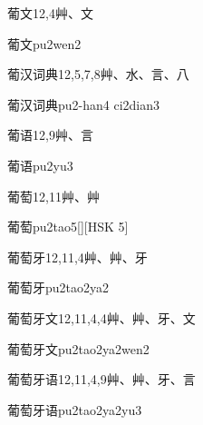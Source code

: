 \begin{Entry}{葡文}{12,4}{⾋、⽂}
  \begin{Phonetics}{葡文}{pu2wen2}
  \end{Phonetics}
\end{Entry}

\begin{Entry}{葡汉词典}{12,5,7,8}{⾋、⽔、⾔、⼋}
  \begin{Phonetics}{葡汉词典}{pu2-han4 ci2dian3}
  \end{Phonetics}
\end{Entry}

\begin{Entry}{葡语}{12,9}{⾋、⾔}
  \begin{Phonetics}{葡语}{pu2yu3}
  \end{Phonetics}
\end{Entry}

\begin{Entry}{葡萄}{12,11}{⾋、⾋}
  \begin{Phonetics}{葡萄}{pu2tao5}[][HSK 5]
  \end{Phonetics}
\end{Entry}

\begin{Entry}{葡萄牙}{12,11,4}{⾋、⾋、⽛}
  \begin{Phonetics}{葡萄牙}{pu2tao2ya2}
  \end{Phonetics}
\end{Entry}

\begin{Entry}{葡萄牙文}{12,11,4,4}{⾋、⾋、⽛、⽂}
  \begin{Phonetics}{葡萄牙文}{pu2tao2ya2wen2}
  \end{Phonetics}
\end{Entry}

\begin{Entry}{葡萄牙语}{12,11,4,9}{⾋、⾋、⽛、⾔}
  \begin{Phonetics}{葡萄牙语}{pu2tao2ya2yu3}
  \end{Phonetics}
\end{Entry}

